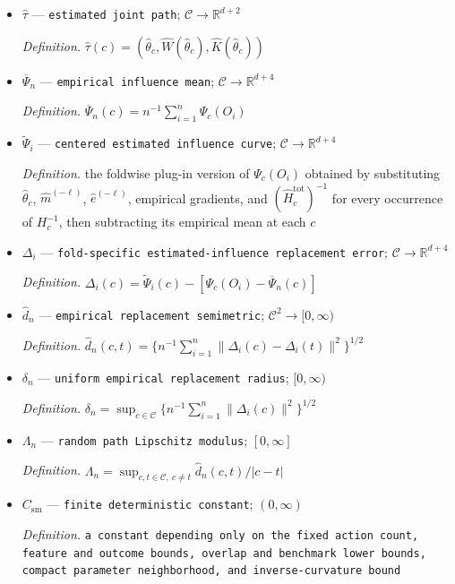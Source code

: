 \documentclass{article}
\begin{document}
\begin{itemize}
  \item \(\widehat\tau\) --- \texttt{estimated joint path}; \(\mathcal C\to\mathbb R^{d+2}\)
  \par\smallskip\noindent\emph{Definition.} \(\widehat\tau(c)=(\widehat\theta_c,\widehat W(\widehat\theta_c),\widehat K(\widehat\theta_c))\)
  \item \(\overline\Psi_n\) --- \texttt{empirical influence mean}; \(\mathcal C\to\mathbb R^{d+4}\)
  \par\smallskip\noindent\emph{Definition.} \(\overline\Psi_n(c)=n^{-1}\sum_{i=1}^n\Psi_c(O_i)\)
  \item \(\widetilde\Psi_i\) --- \texttt{centered estimated influence curve}; \(\mathcal C\to\mathbb R^{d+4}\)
  \par\smallskip\noindent\emph{Definition.} the foldwise plug-in version of \(\Psi_c(O_i)\) obtained by substituting \(\widehat\theta_c\), \(\widehat m^{(-\ell)}\), \(\widehat e^{(-\ell)}\), empirical gradients, and \((\widehat H_c^{\mathrm{tot}})^{-1}\) for every occurrence of \(H_c^{-1}\), then subtracting its empirical mean at each \(c\)
  \item \(\Delta_i\) --- \texttt{fold-\allowbreak{}specific estimated-\allowbreak{}influence replacement error}; \(\mathcal C\to\mathbb R^{d+4}\)
  \par\smallskip\noindent\emph{Definition.} \(\Delta_i(c)=\widetilde\Psi_i(c)-[\Psi_c(O_i)-\overline\Psi_n(c)]\)
  \item \(\widehat d_n\) --- \texttt{empirical replacement semimetric}; \(\mathcal C^2\to[0,\infty)\)
  \par\smallskip\noindent\emph{Definition.} \(\widehat d_n(c,t)=\{n^{-1}\sum_{i=1}^n\|\Delta_i(c)-\Delta_i(t)\|^2\}^{1/2}\)
  \item \(\delta_n\) --- \texttt{uniform empirical replacement radius}; \([0,\infty)\)
  \par\smallskip\noindent\emph{Definition.} \(\delta_n=\sup_{c\in\mathcal C}\{n^{-1}\sum_{i=1}^n\|\Delta_i(c)\|^2\}^{1/2}\)
  \item \(\Lambda_n\) --- \texttt{random path Lipschitz modulus}; \([0,\infty]\)
  \par\smallskip\noindent\emph{Definition.} \(\Lambda_n=\sup_{c,t\in\mathcal C,\ c\ne t}\widehat d_n(c,t)/|c-t|\)
  \item \(C_{\mathrm{sm}}\) --- \texttt{finite deterministic constant}; \((0,\infty)\)
  \par\smallskip\noindent\emph{Definition.} \texttt{a constant depending only on the fixed action count,\allowbreak{} feature and outcome bounds,\allowbreak{} overlap and benchmark lower bounds,\allowbreak{} compact parameter neighborhood,\allowbreak{} and inverse-\allowbreak{}curvature bound}

\end{itemize}
\end{document}
